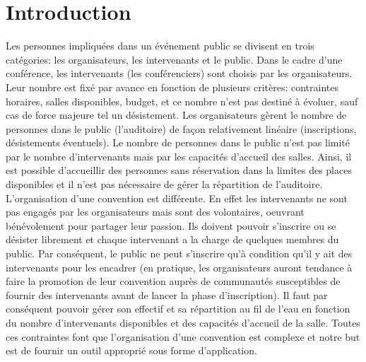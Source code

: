 \documentclass[11pt]{article}
\begin{document}

\renewcommand{\contentsname}{Sommaire}
\tableofcontents
\newpage



\section*{Introduction}

Les personnes impliquées dans un événement public se divisent en trois catégories: les organisateurs, les intervenants et le public. Dans le cadre d'une conférence, les intervenants (les conférenciers) sont choisis par les organisateurs. Leur nombre est fixé par avance en fonction de plusieurs critères: contraintes horaires, salles disponibles, budget, et ce nombre n'est pas destiné à évoluer, sauf cas de force majeure tel un désistement. Les organisateurs gèrent le nombre de personnes dans le public (l'auditoire) de façon relativement linéaire (inscriptions, désistements éventuels). Le nombre de personnes dans le public n'est pas limité par le nombre d'intervenants mais par les capacités d'accueil des salles. Ainsi, il est possible d'accueillir des personnes sans réservation dans la limites des places disponibles et il n'est pas nécessaire de gérer la répartition de l'auditoire.\\

L'organisation d'une convention est différente. En effet les intervenants ne sont pas engagés par les organisateurs mais sont des volontaires, oeuvrant bénévolement pour partager leur passion. Ils doivent pouvoir s'inscrire ou se désister librement et chaque intervenant a la charge de quelques membres du public. Par conséquent, le public ne peut s'inscrire qu'à condition qu'il y ait des intervenants pour les encadrer (en pratique, les organisateurs auront tendance à faire la promotion de leur convention auprès de communautés susceptibles de fournir des intervenants avant de lancer la phase d'inscription). Il faut par conséquent pouvoir gérer son effectif et sa répartition au fil de l'eau en fonction du nombre d'intervenants disponibles et des capacités d'accueil de la salle. Toutes ces contraintes font que l'organisation d'une convention est complexe et notre but est de fournir un outil approprié sous forme d'application. \\
\end{document}
